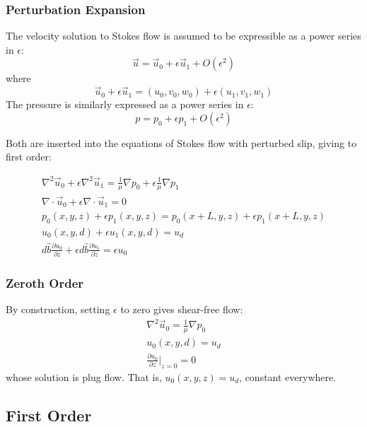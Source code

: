 \documentclass[12pt, a4paper, twoside, openright]{book}
\begin{document}
\subsubsection*{Perturbation Expansion}

The velocity solution to Stokes flow is assumed to be expressible as a power series in $\epsilon$:
\begin{equation}
\vec{u} = \vec{u}_0 + \epsilon \vec{u}_1 + O(\epsilon^2)
\end{equation}
where
\begin{equation}
\vec{u}_0 + \epsilon \vec{u}_1 = (u_0, v_0, w_0) + \epsilon(u_1, v_1, w_1)
\end{equation}
The pressure is similarly expressed as a power series in $\epsilon$:
\begin{equation}
p = p_0 + \epsilon p_1 + O(\epsilon^2)
\end{equation}

Both are inserted into the equations of Stokes flow with perturbed slip, giving to first order:

\begin{gather}
\nabla^2 \vec{u}_0 + \epsilon \nabla^2 \vec{u}_1 =
 \frac{1}{\mu} \nabla p_0 + \epsilon \frac{1}{\mu} \nabla p_1 \\
\nabla \cdot \vec{u}_0 + \epsilon \nabla \cdot \vec{u}_1 = 0  \\
p_0(x,y,z) + \epsilon p_1(x,y,z) = p_0(x+L,y,z) + \epsilon p_1(x+L,y,z) \\
u_0(x,y,d) + \epsilon u_1(x,y,d) = u_d \\ 
 d \hat{b} \frac{\partial u_0}{\partial z}  +
  \epsilon  d \hat{b} \frac{\partial u_1}{\partial z}
= \epsilon u_0
\end{gather}


\subsubsection*{Zeroth Order}

By construction, setting $\epsilon$ to zero gives shear-free flow:
\begin{gather}
\nabla^2 \vec{u}_0  = \frac{1}{\mu} \nabla p_0 \\
u_0(x,y,d) = u_d \\ 
\frac{\partial u_0}{\partial z} \rvert_{z=0} = 0
\end{gather}
whose solution is plug flow.  That is, $u_0(x,y,z) = u_d$, constant everywhere.

\subsection*{First Order}
\end{document}
